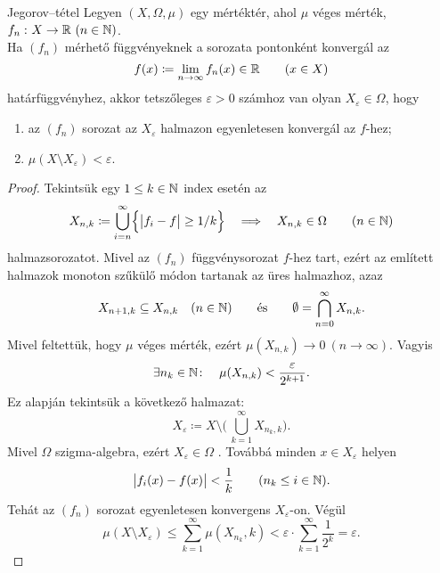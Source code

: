 \documentclass[
]{elteikthesis}[2024/04/26]
\begin{document}
	\newpage
	
	\begin{theorem}{Jegorov--tétel}{}
		Legyen \( (X, \Omega, \mu) \) egy mértéktér, ahol \( \mu \) véges mérték,
		\( f_n \,\colon X \to \mathbb{R} \ (n \in \mathbb{N}) \).\\[6pt]
		Ha \( (f_n) \) mérhető függvényeknek a sorozata pontonként konvergál az
		\[
			f(x) \coloneq \lim_{n \to \infty} f_n(x) \in \mathbb{R} \qquad (x \in X)
		\]
		határfüggvényhez, 
		akkor tetszőleges \( \varepsilon > 0 \) számhoz van olyan 
		\( X_\varepsilon \in \Omega \), hogy
		\begin{enumerate}[label=\alph*)]
			\item az \( (f_n) \) sorozat az \( X_\varepsilon \) halmazon 
			egyenletesen konvergál az \( f \)-hez;
			\item \( \mu( X \setminus X_\varepsilon ) < \varepsilon \).
		\end{enumerate}
	\end{theorem}
	\begin{proof}
		Tekintsük egy \( 1 \leq k \in \mathbb{N} \) index esetén az
		\[
			X_{n,k} \coloneq \bigcup_{i=n}^{\infty} \Bigl\{ \abs\big{f_i - f} \geq 1 / k \Bigr\}
			\quad \Longrightarrow \quad
			X_{n,k} \in \Omega \qquad (n \in \mathbb{N})
		\]
		halmazsorozatot.
		Mivel az \( (f_n) \) függvénysorozat \( f \)-hez tart, 
		ezért az említett halmazok monoton szűkülő módon tartanak az üres halmazhoz, azaz
		\[
			X_{n+1, k} \subseteq X_{n, k} \quad (n \in \mathbb{N})
			\qquad \text{és} \qquad
			\emptyset = \bigcap_{n=0}^{\infty} X_{n, k}.
		\]
		Mivel feltettük, hogy \( \mu \) véges mérték, 
		ezért \( \mu(X_{n, k}) \longrightarrow 0 \ (n \to \infty) \). Vagyis
		\[
			\exists	n_k \in \mathbb{N} \colon \quad
			\mu(X_{n, k}) < \frac{\varepsilon}{2^{k + 1}}.
		\]
		Ez alapján tekintsük a következő halmazat:
		\[
			X_\varepsilon \coloneq
			X \setminus \Biggl( \, \bigcup_{k=1}^{\infty} X_{n_k, k} \Biggr).
		\]
		Mivel \( \Omega \) szigma-algebra, ezért \( X_\varepsilon \in \Omega \) .
		Továbbá minden \( x \in X_\varepsilon \) helyen
		\[
			\abs\big{ f_i(x) - f(x) } < \frac{1}{k} \qquad (n_k \leq i \in \mathbb{N}).
		\]
		Tehát az \( (f_n) \) sorozat egyenletesen konvergens \( X_\varepsilon \)-on.
		Végül
		\[
			\mu( X \setminus X_\varepsilon ) \leq 
			\sum_{k = 1}^{\infty} \mu(X_{n_k}, k) <
			\varepsilon \cdot \sum_{k = 1}^{\infty} \frac{1}{2^k} =
			\varepsilon.
		\]
	\end{proof}
	
\end{document}
